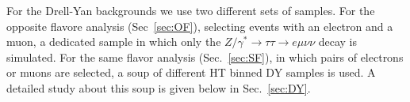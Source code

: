 % 

For the Drell-Yan backgrounds we use two different sets of samples. For the
opposite flavore analysis (Sec~\ref{sec:OF}), selecting events with an
electron and a muon, a dedicated sample in which only the
$Z/\gamma^{*}\rightarrow{}\tau\tau\rightarrow{e\mu\nu\nu}$ decay is simulated.
For the same flavor analysis (Sec.~\ref{sec:SF}), in which pairs of electrons
or muons are selected, a soup of different HT binned DY samples is used. A
detailed study about this soup is given below in Sec.~\ref{sec:DY}.

